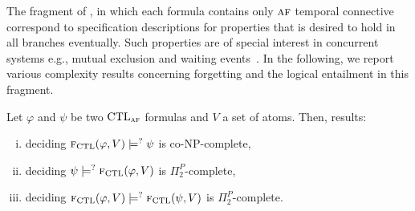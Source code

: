 \documentclass{article}
\begin{document}
The fragment of \CTL, in which each formula contains only $\textsc{a} \textsc{f}$ temporal connective correspond to specification descriptions for properties that is desired to hold in all branches eventually. Such properties are of special interest in concurrent systems e.g., mutual exclusion and  waiting events~\cite{Baier:PMC:2008}.
In the following, we report various complexity results concerning forgetting and the logical entailment in this fragment.

\begin{theorem}\label{thm:comF}
Let $\varphi$ and $\psi$ be two $\textrm{CTL}_{\textsc{a} \textsc{f}}$ formulas and $V$ a set of atoms. Then,
results:
\begin{enumerate}[(i)]
  \item deciding  ${\textsc{f}_{\textrm{CTL}}}(\varphi, V ) \models^? \psi$ is co-NP-complete,
  \item deciding  $\psi \models^? {\textsc{f}_{\textrm{CTL}}}(\varphi, V)$ is $\Pi_2^P$-complete,
  \item deciding ${\textsc{f}_{\textrm{CTL}}}(\varphi, V) \models^? {\textsc{f}_{\textrm{CTL}}}(\psi, V)$ is $\Pi_2^P$-complete.
\end{enumerate}
\end{theorem}
\end{document}
